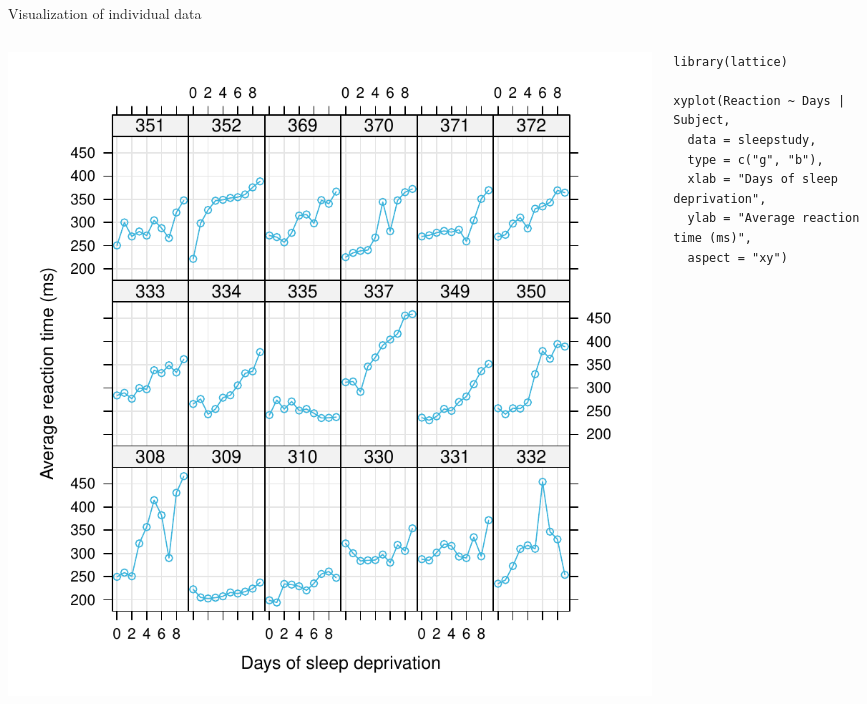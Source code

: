 \documentclass[aspectratio=169]{beamer}
\begin{document}
\begin{frame}[fragile]{Visualization of individual data}
  \begin{columns}
    \begin{column}{.53\textwidth}
      \includegraphics[scale=.5]{fig/sleep_subjects}
    \end{column}
    \begin{column}{.55\textwidth}
\begin{lstlisting}
library(lattice)

xyplot(Reaction ~ Days | Subject,
  data = sleepstudy,
  type = c("g", "b"),
  xlab = "Days of sleep deprivation",
  ylab = "Average reaction time (ms)",
  aspect = "xy")
\end{lstlisting}
    \end{column}
  \end{columns}
\end{frame}
\end{document}
